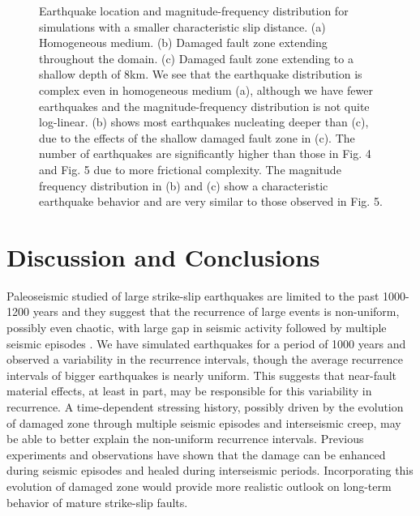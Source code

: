 \documentclass[11pt]{article}
\begin{document}
\begin{figure}[!htb]
{    }
    \caption{Earthquake location and magnitude-frequency distribution for simulations with a smaller characteristic slip distance. (a) Homogeneous medium. (b) Damaged fault zone extending throughout the domain. (c) Damaged fault zone extending to a shallow depth of 8km. We see that the earthquake distribution is complex even in homogeneous medium (a), although we have fewer earthquakes and the magnitude-frequency distribution is not quite log-linear. (b) shows most earthquakes nucleating deeper than (c), due to the effects of the shallow damaged fault zone in (c). The number of earthquakes are significantly higher than those in Fig. 4 and Fig. 5 due to more frictional complexity. The magnitude frequency distribution in (b) and (c) show a characteristic earthquake behavior and are very similar to those observed in Fig. 5.}
\end{figure}

\section{Discussion and Conclusions}
Paleoseismic studied of large strike-slip earthquakes are limited to the past 1000-1200 years and they suggest that the recurrence of large events is non-uniform, possibly even chaotic, with large gap in seismic activity followed by multiple seismic episodes \citep{goes_1996, seitz_2000, fumal_2002, toke_2006}. We have simulated earthquakes for a period of 1000 years and observed a variability in the recurrence intervals, though the average recurrence intervals of bigger earthquakes is nearly uniform. This suggests that near-fault material effects, at least in part, may be responsible for this variability in recurrence. A time-dependent stressing history, possibly driven by the evolution of damaged zone through multiple seismic episodes and interseismic creep, may be able to better explain the non-uniform  recurrence intervals.  Previous experiments and observations \citep{peng_2006, stanchits_2006} have shown that the damage can be enhanced during seismic episodes and healed during interseismic periods. Incorporating this evolution of damaged zone would provide more realistic outlook on long-term behavior of mature strike-slip faults.
\end{document}
